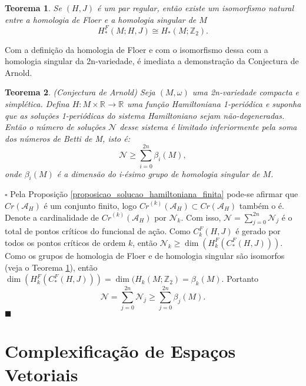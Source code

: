 \documentclass[12pt]{book}
\newtheorem{teorema}{Teorema}[section]
\newenvironment{prova}[1]{$\square$ #1}{\hfill$\blacksquare$}
\newcommand{\funcionalH}{\mathcal{A}_{H}}
\newcommand{\inteiros}{\mathbb{Z}}
\newcommand{\pontoscriticos}[1]{\textit{Cr}(#1)}
\newcommand{\pontoscriticosordem}[2]{\textit{Cr}^{(#1)}(#2)}
\newcommand{\real}[1]{\mathbb{R}^{#1}}
\newcommand{\reta}{\real{}}
\begin{document}
	\begin{teorema}\label{teorema_isomorfismo_homologia_floer}
		Se $(H,J)$ é um par regular, então 
		existe um isomorfismo natural entre a homologia de Floer e a homologia singular de $M$
		$$
		H^{F}_{*}(M;H,J) \cong H_{*}(M;\inteiros_{2}). 
		$$
		
	\end{teorema}
	
	Com a definição da homologia de Floer e com o isomorfismo dessa com a homologia singular da 2n-variedade, é imediata a demonstração da Conjectura de Arnold.
	
	\begin{teorema}
			(Conjectura de Arnold) Seja $(M,\omega)$ uma 2n-variedade compacta e simplética. Defina $H:M\times \real{} \to \reta$ uma função Hamiltoniana 1-periódica e suponha que as soluções 1-periódicas do sistema Hamiltoniano sejam não-degeneradas. Então o número de soluções $\mathcal{N}$ desse sistema é limitado inferiormente pela soma dos números de Betti de M, isto é:
				$$
				\mathcal{N}\geq \sum_{i=0}^{2n}\beta_{i}(M),
				$$
				onde $\beta_{i}(M)$ é a dimensão do i-ésimo grupo de homologia singular de $M$.
	\end{teorema}
	\begin{prova}
		Pela Proposição \ref{proposicao_solucao_hamiltoniana_finita} pode-se afirmar que $\pontoscriticos{\funcionalH}$ é um conjunto finito, logo $\pontoscriticosordem{k}{\funcionalH} \subset \pontoscriticos{\funcionalH}$ também o é. Denote a cardinalidade de $\pontoscriticosordem{k}{\funcionalH}$ por $\mathcal{N}_{k}$. Com isso, $\mathcal{N} =\sum_{j=0}^{2n} \mathcal{N}_{j}$ é o total de pontos críticos do funcional de ação. Como $C^{F}_{k}(H,J)$ é gerado por todos os pontos críticos de ordem $k$, então $\mathcal{N}_{k}\geq \dim(	H^{F}_{k}(C^{F}_{*}(H,J)))$. Como os grupos de homologia de Floer e de homologia singular são isomorfos (veja o Teorema \ref{teorema_isomorfismo_homologia_floer}), então $\dim(	H^{F}_{k}(C^{F}_{*}(H,J)))  = \dim(	H_{k}(M;\inteiros_{2}) = \beta_{k}(M)$. Portanto
		$$
		\mathcal{N} =\sum_{j=0}^{2n} \mathcal{N}_{j} \geq \sum_{j=0}^{2n} \beta_{j}(M).
		$$ 
	\end{prova}
	
	\appendix
	
	\chapter{Complexificação de Espaços Vetoriais}\label{apendice_complexificacao_espacos_vetoriais}
\end{document}
